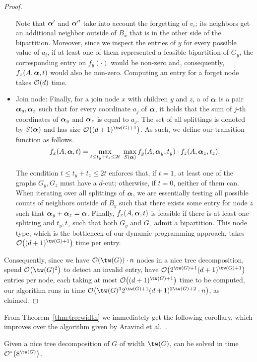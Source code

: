 \begin{proof}
\begin{itemize}
        Note that $\boldsymbol{\alpha}'$ and $\boldsymbol{\alpha}''$ take into account the forgetting of $v_i$; its neighbors get an additional neighbor outside of $B_x$ that is in the other side of the bipartition.
        Moreover, since we inspect the entries of $y$ for every possible value of $a_i$, if at least one of them represented a feasible bipartition of $G_y$, the corresponding entry on $f_y(\cdot)$ would be non-zero and, consequently, $f_x(A, \boldsymbol{\alpha}, t)$ would also be non-zero.
        Computing an entry for a forget node takes $\mathcal{O}\!\left(d\right)$ time.

        \item Join node: Finally, for a join node $x$ with children $y$ and $z$, a  of $\boldsymbol{\alpha}$ is a pair $\boldsymbol{\alpha}_y, \boldsymbol{\alpha}_z$ such that for every coordinate $a_j$ of $\boldsymbol{\alpha}$, it holds that the sum of $j$-th coordinates of $\boldsymbol{\alpha}_y$ and $\boldsymbol{\alpha}_z$ is equal to $a_j$. The set of all splittings is denoted by $S(\boldsymbol{\alpha})$ and has size $\bigO{(d+1)^{\tw(G)+1}}$.
        As such, we define our transition function as follows.
        \begin{equation*}
            f_x(A, \boldsymbol{\alpha}, t) = \max_{t \leq t_y + t_z \leq 2t}\ \max_{S(\boldsymbol{\alpha})} f_y(A, \boldsymbol{\alpha}_y, t_y) \cdot f_z(A, \boldsymbol{\alpha}_z, t_z).
        \end{equation*}

        The condition $t \leq t_y + t_z \leq 2t$ enforces that, if $t = 1$, at least one of the graphs $G_y, G_z$ must have a $d$-cut; otherwise, if $t = 0$, neither of them can.
        When iterating over all splittings of $\boldsymbol{\alpha}$, we are essentially testing all possible counts of neighbors outside of $B_y$ such that there exists some entry for node $z$ such that $\boldsymbol{\alpha}_y + \boldsymbol{\alpha}_z = \boldsymbol{\alpha}$.
        Finally, $f_x(A, \boldsymbol{\alpha}, t)$ is feasible if there is at least one splitting and $t_y, t_z$ such that both $G_y$ and $G_z$ admit a bipartition.
        This node type, which is the bottleneck of our dynamic programming approach, takes $\bigO{(d+1)^{\tw(G)+1}}$ time per entry.
    \end{itemize}

    Consequently, since we have $\bigO{\tw(G)} \cdot n$ nodes in a nice tree decomposition, spend $\bigO{\tw(G)^2}$ to detect an invalid entry, have $\bigO{2^{\tw(G) +1}(d+1)^{\tw(G)+1}}$ entries per node, each taking at most $\bigO{(d+1)^{\tw(G)+1}}$ time to be computed, our algorithm runs in time $\bigO{\tw(G)^32^{\tw(G)+1}(d+1)^{2\tw(G)+2}\cdot n}$, as claimed.
\end{proof}

From Theorem~\ref{thm:treewidth} we immediately get the following corollary, which improves over the algorithm given by Aravind et al.~\cite{matching_cut_structural}.

\begin{corollary}
   Given a nice tree decomposition of $G$ of width $\tw(G)$,  can be solved in time  $\bigOs{8^{\tw(G)}}$.
\end{corollary}